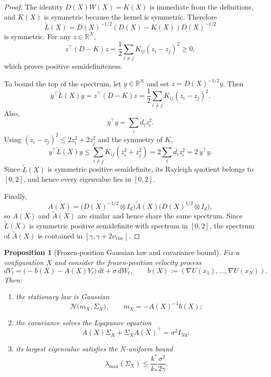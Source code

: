 \documentclass[11pt]{article}
\newtheorem{proposition}[theorem]{Proposition}
\theoremstyle{definition}
\theoremstyle{remark}
\newcommand{\R}{\mathbb{R}}
\begin{document}
\begin{proof}
The identity $D(X)W(X)=K(X)$ is immediate from the definitions, and $K(X)$ is
symmetric because the kernel is symmetric. Therefore
\[
\widetilde L(X)
=
D(X)^{-1/2}(D(X)-K(X))D(X)^{-1/2}
\]
is symmetric. For any $z\in \R^N$,
\[
z^\top (D-K)z
=
\frac12\sum_{i\neq j}K_{ij}(z_i-z_j)^2\geq0,
\]
which proves positive semidefiniteness.

To bound the top of the spectrum, let $y\in\R^N$ and set
$z=D(X)^{-1/2}y$. Then
\[
y^\top \widetilde L(X)y
=
z^\top (D-K)z
=
\frac12\sum_{i\neq j}K_{ij}(z_i-z_j)^2.
\]
Also,
\[
y^\top y
=
\sum_i d_i z_i^2.
\]
Using $(z_i-z_j)^2\leq 2z_i^2+2z_j^2$ and the symmetry of $K$,
\[
y^\top \widetilde L(X)y
\leq
\sum_{i\neq j}K_{ij}(z_i^2+z_j^2)
=
2\sum_i d_i z_i^2
=
2\,y^\top y.
\]
Since $\widetilde L(X)$ is symmetric positive semidefinite, its Rayleigh
quotient belongs to $[0,2]$, and hence every eigenvalue lies in $[0,2]$.

Finally,
\[
A(X)
=
\bigl(D(X)^{-1/2}\otimes I_d\bigr)\widetilde A(X)
\bigl(D(X)^{1/2}\otimes I_d\bigr),
\]
so $A(X)$ and $\widetilde A(X)$ are similar and hence share the same spectrum.
Since $\widetilde L(X)$ is symmetric positive semidefinite with spectrum in
$[0,2]$, the spectrum of $\widetilde A(X)$ is contained in
$[\gamma,\gamma+2\nu_{\mathrm{visc}}]$.
\end{proof}

\begin{proposition}[Frozen-position Gaussian law and covariance bound]\label{prop:gaussian}
Fix a configuration $X$ and consider the frozen-position velocity process
\[
dV_t=\bigl(-b(X)-A(X)V_t\bigr)\,dt+\sigma\,dW_t,
\qquad
b(X):=(\nabla U(x_1),\dots,\nabla U(x_N)).
\]
Then:
\begin{enumerate}[label=\textnormal{(\roman*)},leftmargin=1.5em]
\item the stationary law is Gaussian
\[
\mathcal N\bigl(m_X,\Sigma_X\bigr),
\qquad
m_X=-A(X)^{-1}b(X);
\]
\item the covariance solves the Lyapunov equation
\begin{equation}\label{eq:lyap}
A(X)\Sigma_X+\Sigma_X A(X)^\top=\sigma^2 I_{Nd};
\end{equation}
\item its largest eigenvalue satisfies the $N$-uniform bound
\[
\lambda_{\max}(\Sigma_X)
\leq
\frac{k^*}{k_*}\frac{\sigma^2}{2\gamma}.
\]
\end{enumerate}
\end{proposition}
\end{document}
